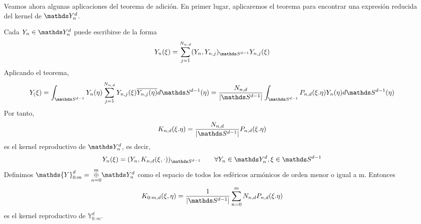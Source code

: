 Veamos ahora algunas aplicaciones del teorema de adición. En primer lugar, aplicaremos el teorema para encontrar una expresión reducida del kernel de $\spharm$.
\medskip

Cada $Y_n \in \spharm$ puede escribirse de la forma
$$Y_n(\xi) = \sum_{j=1}^{N_{n,d}} (Y_n,Y_{n,j})_{\sphere} Y_{n,j}(\xi)$$
Aplicando el teorema,
$$Y_(\xi)=\int_{\sphere} Y_n(\eta)\sum_{j=1}^{N_{n,d}}Y_{n,j}(\xi)\overline{Y_{n,j}(\eta)}d\sphere(\eta) = \frac{N_{n,d}}{|\sphere|}\int_{\sphere}P_{n,d}(\xi.\eta)Y_n(\eta)d\sphere(\eta)$$
Por tanto, $$
K_{n,d}(\xi.\eta)= \frac{N_{n,d}}{|\sphere|}P_{n,d}(\xi.\eta)
$$
es el kernel reproductivo de $\spharm$, es decir, $$
Y_n(\xi) = (Y_n,K_{n,d}(\xi,\cdot))_{\sphere} \qquad \forall Y_n \in \spharm, \xi \in \sphere$$
Definimos $\mathds{Y}_{0:m}^d = \underset{n=0}{\overset{m}{\oplus}} \spharm$ como el espacio de todos los esféricos armónicos de orden menor o igual a m. Entonces 
$${K}_{0:m,d}(\xi,\eta) = \frac{1}{|\sphere|}\sum_{n=0}^{m}N_{n,d}P_{n,d}(\xi.\eta)$$ es el kernel reproductivo de  $\mathds{Y}_{0:m}^d$.
\medskip


